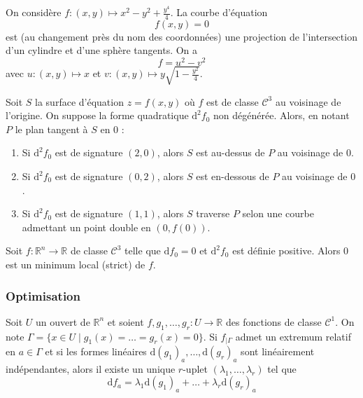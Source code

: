 
  \begin{example}
    On considère $f : (x,y) \mapsto x^2-y^2+\frac{y^4}{4}$. La courbe d'équation
    \[ f(x,y) = 0 \]
    est (au changement près du nom des coordonnées) une projection de l'intersection d'un cylindre et d'une sphère tangents. On a
    \[ f = u^2 - v^2 \]
    avec $u : (x,y) \mapsto x$ et $v : (x,y) \mapsto y \sqrt{1-\frac{y^2}{4}}$.
  \end{example}


  \begin{application}
    Soit $S$ la surface d'équation $z = f(x, y)$ où $f$ est de classe $\mathcal{C}^3$ au voisinage de l'origine. On suppose la forme quadratique $\mathrm{d}^2 f_0$ non dégénérée. Alors, en notant $P$ le plan tangent à $S$ en $0$ :
    \begin{enumerate}[label={\bfseries(\roman*)}]
      \item Si $\mathrm{d}^2 f_0$ est de signature $(2, 0)$, alors $S$ est au-dessus de $P$ au voisinage de $0$.
      \item Si $\mathrm{d}^2 f_0$ est de signature $(0, 2)$, alors $S$ est en-dessous de $P$ au voisinage de $0$.
      \item Si $\mathrm{d}^2 f_0$ est de signature $(1, 1)$, alors $S$ traverse $P$ selon une courbe admettant un point double en $(0, f(0))$.
    \end{enumerate}
  \end{application}


  \begin{application}
    Soit $f : \mathbb{R}^n \rightarrow \mathbb{R}$ de classe $\mathcal{C}^3$ telle que $\mathrm{d}f_0 = 0$ et $\mathrm{d}^2 f_0$ est définie positive. Alors $0$ est un minimum local (strict) de $f$.
  \end{application}

  \subsubsection{Optimisation}


  \begin{theorem}
    \label{214-2}
    Soit $U$ un ouvert de $\mathbb{R}^n$ et soient $f, g_1, \dots, g_r : U \rightarrow \mathbb{R}$ des fonctions de classe $\mathcal{C}^1$. On note $\Gamma = \{ x \in U \mid g_1(x) = \dots = g_r(x) = 0 \}$. Si $f_{|\Gamma}$ admet un extremum relatif en $a \in \Gamma$ et si les formes linéaires $\mathrm{d}(g_1)_a, \dots, \mathrm{d}(g_r)_a$ sont linéairement indépendantes, alors il existe un unique $r$-uplet $(\lambda_1, \dots, \lambda_r)$ tel que
    \[ \mathrm{d}f_a = \lambda_1 \mathrm{d}(g_1)_a + \dots + \lambda_r \mathrm{d}(g_r)_a \]
  \end{theorem}

